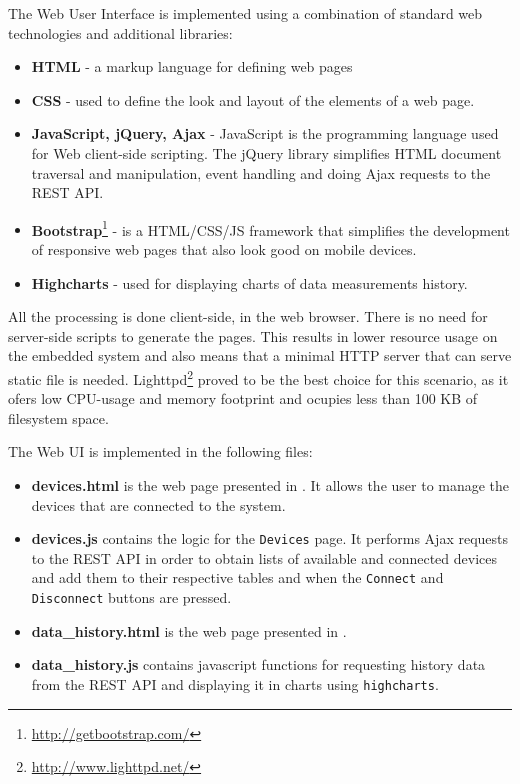 The Web User Interface is implemented using a combination of standard web technologies and additional libraries:
\begin{itemize}
\item \textbf{HTML} - a markup language for defining web pages
\item \textbf{CSS} - used to define the look and layout of the elements of a web page.
\item \textbf{JavaScript, jQuery, Ajax} - JavaScript is the programming language used for Web client-side scripting. The jQuery library simplifies HTML document traversal and manipulation, event handling and doing Ajax requests to the REST API.
\item \textbf{Bootstrap}\footnote{\url{http://getbootstrap.com/}} - is a HTML/CSS/JS framework that simplifies the development of responsive web pages that also look good on mobile devices.
\item \textbf{Highcharts} - used for displaying charts of data measurements history.
\end{itemize}

All the processing is done client-side, in the web browser. There is no need for server-side scripts to generate the pages. This results in lower resource usage on the embedded system and also means that a minimal HTTP server that can serve static file is needed. Lighttpd\footnote{\url{http://www.lighttpd.net/}} proved to be the best choice for this scenario, as it ofers low CPU-usage and memory footprint and ocupies less than 100 KB of filesystem space.

The Web UI is implemented in the following files:
\begin{itemize}
\item \textbf{devices.html} is the web page presented in . It allows the user to manage the devices that are connected to the system.
\item \textbf{devices.js} contains the logic for the \texttt{Devices} page. It performs Ajax requests to the REST API in order to obtain lists of available and connected devices and add them to their respective tables and when the \texttt{Connect} and \texttt{Disconnect} buttons are pressed.
\item \textbf{data_history.html} is the web page presented in .
\item \textbf{data_history.js} contains javascript functions for requesting history data from the REST API and displaying it in charts using \texttt{highcharts}.
\end{itemize}